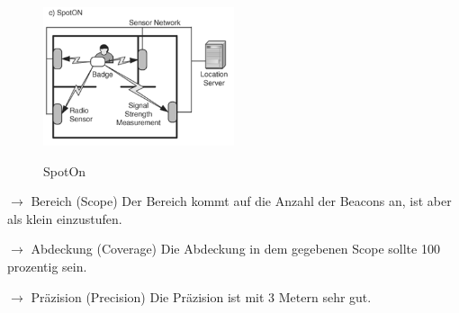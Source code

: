 \begin{figure}[h]
\centering
\includegraphics[width=0.5\textwidth]{ref/images/SpotOn.PNG}
\caption[SpotOn]{SpotOn}
\label{fig:SpotOn}
\cite[S. 201]{Schiller2004}
\end{figure}


$\longrightarrow$ Bereich (Scope) Der Bereich kommt auf die Anzahl der Beacons an, ist aber als klein einzustufen.

$\longrightarrow$ Abdeckung (Coverage) Die Abdeckung in dem gegebenen Scope sollte 100 prozentig sein.

$\longrightarrow$ Präzision (Precision) Die Präzision ist mit 3 Metern sehr gut. 



